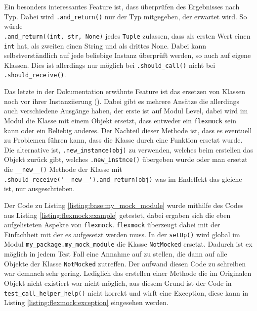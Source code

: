 Ein besonders interessantes Feature ist, dass überprüfen des Ergebnisses nach
Typ. Dabei wird \lstinline{.and_return()} nur der Typ mitgegeben, der erwartet
wird. So würde
\\%
\lstinline{.and_return((int, str, None)} jedes \lstinline{Tuple}
zulassen, dass als ersten Wert einen \lstinline{int} hat, als zweiten einen
String und als drittes None. Dabei kann selbstverständlich auf jede beliebige
Instanz überprüft werden, so auch auf eigene Klassen. Dies ist allerdings nur
möglich bei \lstinline{.should_call()} nicht bei \lstinline{.should_receive()}.

Das letzte in der Dokumentation erwähnte Feature ist das ersetzen von Klassen
noch vor ihrer Instanziierung (\cite{flexmock:docs:0.10.3}). Dabei gibt es
mehrere Ansätze die allerdings auch verschiedene Ausgänge haben, der erste ist
auf Modul Level, dabei wird im Modul die Klasse mit einem Objekt ersetzt, dass
entweder ein \lstinline{flexmock} sein kann oder ein Beliebig anderes. Der
Nachteil dieser Methode ist, dass es eventuell zu Problemen führen kann, dass
die Klasse durch eine Funktion ersetzt wurde. Die alternative ist,
\lstinline{.new_instance(obj)} zu verwenden, welches beim erstellen das Objekt
zurück gibt, welches \lstinline{.new_instnce()} übergeben wurde oder man ersetzt
die \lstinline{__new__()} Methode der Klasse mit
\lstinline{.should_receive('__new__').and_return(obj)} was im Endeffekt das
gleiche ist, nur ausgeschrieben.
\newline

Der Code zu Listing \ref{listing:base:my_mock_module} wurde mithilfe des Codes
aus Listing \ref{listing:flexmock:example} getestet, dabei ergaben sich die eben
aufgelisteten Aspekte von \lstinline{flexmock}. \lstinline{flexmock} überzeugt
dabei mit der Einfachheit mit der es aufgesetzt werden muss. In der
\lstinline{setUp()} wird global im Modul \lstinline{my_package.my_mock_module}
die Klasse \lstinline{NotMocked} ersetzt. Dadurch ist ex möglich in jedem Test
Fall eine Annahme auf zu stellen, die dann auf alle Objekte der Klasse
\lstinline{NotMocked} zutreffen. Der aufwand diesen Code zu schreiben war
demnach sehr gering. Lediglich das erstellen einer Methode die im Originalen
Objekt nicht existiert war nicht möglich, aus diesem Grund ist der Code in
\lstinline{test_call_helper_help()} nicht korrekt und wirft eine Exception,
diese kann in Listing \ref{listing:flexmock:exception} eingesehen werden.
\newline

